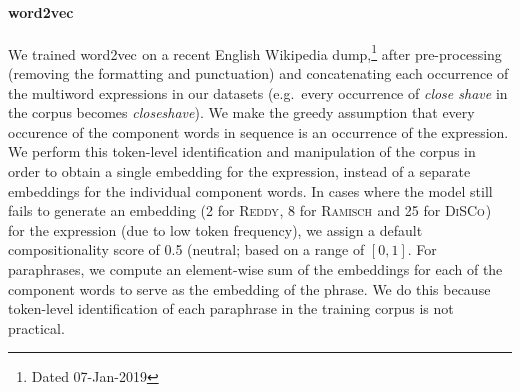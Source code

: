\documentclass[11pt,a4paper]{article}
\newcommand{\embmethod}[2][]{\textsf{#2}$_{\text{#1}}$\xspace}
\newcommand{\wordtovec}{\embmethod{word2vec}}
\newcommand{\dataset}[2][]{\textsc{#2}$_{\text{#1}}$\xspace}
\newcommand{\reddy}{\dataset{Reddy}}
\newcommand{\ramisch}{\dataset{Ramisch}}
\newcommand{\discoj}[1][]{\dataset[#1]{DiSCo}}
\begin{document}
\paragraph{\wordtovec}
We trained \wordtovec \cite{Mikolov2013b} on a recent English Wikipedia dump,\footnote{\label{wiki}Dated 07-Jan-2019} after pre-processing (removing the formatting and punctuation) and concatenating each occurrence of the multiword expressions in our datasets (e.g.\ every occurrence of \textit{close shave} in the corpus becomes \textit{closeshave}). We make the greedy assumption that every occurence of the component words in sequence is an occurrence of the expression. We perform this token-level identification and manipulation of the corpus in order to obtain a single embedding for the expression, instead of a separate embeddings for the individual component words. In cases where the model still fails to generate an embedding (2 for \reddy, 8 for \ramisch and 25 for \discoj) for the expression (due to low token frequency), we assign a default compositionality score of 0.5 (neutral; based on a range of $[0,1]$. For paraphrases, we compute an element-wise sum of the embeddings for each of the component words to serve as the embedding of the phrase. We do this because token-level identification of each paraphrase in the training corpus is not practical.
\end{document}
